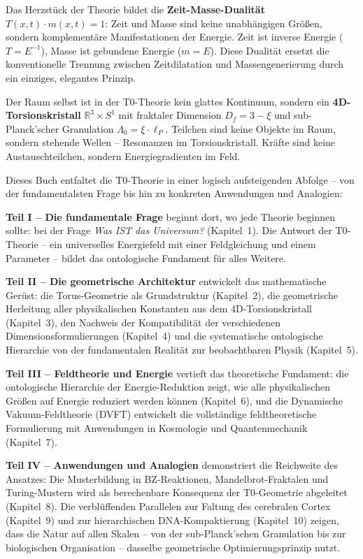 \documentclass[11pt,oneside]{book}
\begin{document}
Das Herzstück der Theorie bildet die \textbf{Zeit-Masse-Dualität} $T(x,t) \cdot m(x,t) = 1$: Zeit und Masse sind keine unabhängigen Größen, sondern komplementäre Manifestationen der Energie. Zeit ist inverse Energie ($T = E^{-1}$), Masse ist gebundene Energie ($m = E$). Diese Dualität ersetzt die konventionelle Trennung zwischen Zeitdilatation und Massengenerierung durch ein einziges, elegantes Prinzip.

Der Raum selbst ist in der T0-Theorie kein glattes Kontinuum, sondern ein \textbf{4D-Torsionskristall} $\mathbb{R}^3 \times S^1$ mit fraktaler Dimension $D_f = 3 - \xi$ und sub-Planck'scher Granulation $\Lambda_0 = \xi \cdot \ell_P$. Teilchen sind keine Objekte im Raum, sondern stehende Wellen -- Resonanzen im Torsionskristall. Kräfte sind keine Austauschteilchen, sondern Energiegradienten im Feld.

\bigskip

Dieses Buch entfaltet die T0-Theorie in einer logisch aufsteigenden Abfolge -- von der fundamentalsten Frage bis hin zu konkreten Anwendungen und Analogien:

\textbf{Teil I -- Die fundamentale Frage} beginnt dort, wo jede Theorie beginnen sollte: bei der Frage \textit{Was IST das Universum?} (Kapitel~1). Die Antwort der T0-Theorie -- ein universelles Energiefeld mit einer Feldgleichung und einem Parameter -- bildet das ontologische Fundament für alles Weitere.

\textbf{Teil II -- Die geometrische Architektur} entwickelt das mathematische Gerüst: die Torus-Geometrie als Grundstruktur (Kapitel~2), die geometrische Herleitung aller physikalischen Konstanten aus dem 4D-Torsionskristall (Kapitel~3), den Nachweis der Kompatibilität der verschiedenen Dimensionsformulierungen (Kapitel~4) und die systematische ontologische Hierarchie von der fundamentalen Realität zur beobachtbaren Physik (Kapitel~5).

\textbf{Teil III -- Feldtheorie und Energie} vertieft das theoretische Fundament: die ontologische Hierarchie der Energie-Reduktion zeigt, wie alle physikalischen Größen auf Energie reduziert werden können (Kapitel~6), und die Dynamische Vakuum-Feldtheorie (DVFT) entwickelt die vollständige feldtheoretische Formulierung mit Anwendungen in Kosmologie und Quantenmechanik (Kapitel~7).

\textbf{Teil IV -- Anwendungen und Analogien} demonstriert die Reichweite des Ansatzes: Die Musterbildung in BZ-Reaktionen, Mandelbrot-Fraktalen und Turing-Mustern wird als berechenbare Konsequenz der T0-Geometrie abgeleitet (Kapitel~8). Die verblüffenden Parallelen zur Faltung des cerebralen Cortex (Kapitel~9) und zur hierarchischen DNA-Kompaktierung (Kapitel~10) zeigen, dass die Natur auf allen Skalen -- von der sub-Planck'schen Granulation bis zur biologischen Organisation -- dasselbe geometrische Optimierungsprinzip nutzt.
\end{document}

